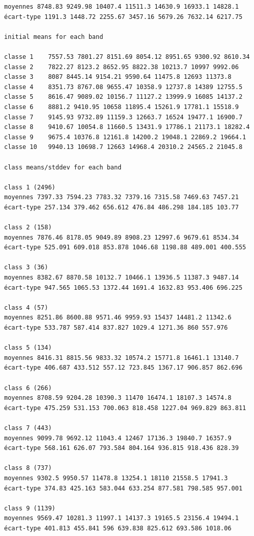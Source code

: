\documentclass[earth,article,accept,pdftex,moreauthors]{Definitions/mdpi}
\begin{document}
{\begin{scriptsize}
\begin{verbatim}
moyennes 8748.83 9249.98 10407.4 11511.3 14630.9 16933.1 14828.1
écart-type 1191.3 1448.72 2255.67 3457.16 5679.26 7632.14 6217.75

initial means for each band

classe 1    7557.53 7801.27 8151.69 8054.12 8951.65 9300.92 8610.34
classe 2    7822.27 8123.2 8652.95 8822.38 10213.7 10997 9992.06
classe 3    8087 8445.14 9154.21 9590.64 11475.8 12693 11373.8
classe 4    8351.73 8767.08 9655.47 10358.9 12737.8 14389 12755.5
classe 5    8616.47 9089.02 10156.7 11127.2 13999.9 16085 14137.2
classe 6    8881.2 9410.95 10658 11895.4 15261.9 17781.1 15518.9
classe 7    9145.93 9732.89 11159.3 12663.7 16524 19477.1 16900.7
classe 8    9410.67 10054.8 11660.5 13431.9 17786.1 21173.1 18282.4
classe 9    9675.4 10376.8 12161.8 14200.2 19048.1 22869.2 19664.1
classe 10   9940.13 10698.7 12663 14968.4 20310.2 24565.2 21045.8

class means/stddev for each band

class 1 (2496)
moyennes 7397.33 7594.23 7783.32 7379.16 7315.58 7469.63 7457.21
écart-type 257.134 379.462 656.612 476.84 486.298 184.185 103.77

class 2 (158)
moyennes 7876.46 8178.05 9049.89 8908.23 12997.6 9679.61 8534.34
écart-type 525.091 609.018 853.878 1046.68 1198.88 489.001 400.555

class 3 (36)
moyennes 8382.67 8870.58 10132.7 10466.1 13936.5 11387.3 9487.14
écart-type 947.565 1065.53 1372.44 1691.4 1632.83 953.406 696.225

class 4 (57)
moyennes 8251.86 8600.88 9571.46 9959.93 15437 14481.2 11342.6
écart-type 533.787 587.414 837.827 1029.4 1271.36 860 557.976

class 5 (134)
moyennes 8416.31 8815.56 9833.32 10574.2 15771.8 16461.1 13140.7
écart-type 406.687 433.512 557.12 723.845 1367.17 906.857 862.696

class 6 (266)
moyennes 8708.59 9204.28 10390.3 11470 16474.1 18107.3 14574.8
écart-type 475.259 531.153 700.063 818.458 1227.04 969.829 863.811

class 7 (443)
moyennes 9099.78 9692.12 11043.4 12467 17136.3 19840.7 16357.9
écart-type 568.161 626.07 793.584 804.164 936.815 918.436 828.39

class 8 (737)
moyennes 9302.5 9950.57 11478.8 13254.1 18110 21558.5 17941.3
écart-type 374.83 425.163 583.044 633.254 877.581 798.585 957.001

class 9 (1139)
moyennes 9569.47 10281.3 11997.1 14137.3 19165.5 23156.4 19494.1
écart-type 401.813 455.841 596 639.838 825.612 693.586 1018.06


\end{verbatim}
\end{scriptsize}}
\end{document}
